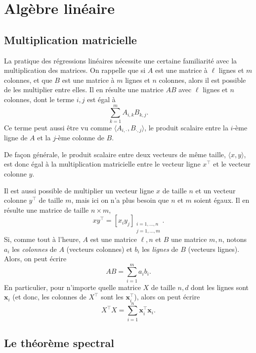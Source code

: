 \documentclass[
  10,
  letterpaper,
  DIV=11,
  numbers=noendperiod]{scrreport}
\newcommand{\bx}{\mathbf{x}}
\theoremstyle{plain}
\theoremstyle{definition}
\theoremstyle{plain}
\theoremstyle{definition}
\theoremstyle{definition}
\theoremstyle{plain}
\theoremstyle{remark}
\begin{document}

\hypertarget{app-al}{%
\chapter{Algèbre linéaire}\label{app-al}}

\hypertarget{multiplication-matricielle}{%
\section{Multiplication matricielle}\label{multiplication-matricielle}}

La pratique des régressions linéaires nécessite une certaine familiarité
avec la multiplication des matrices. On rappelle que si \(A\) est une
matrice à \(\ell\) lignes et \(m\) colonnes, et que \(B\) est une
matrice à \(m\) lignes et \(n\) colonnes, alors il est possible de les
multiplier entre elles. Il en résulte une matrice \(AB\) avec \(\ell\)
lignes et \(n\) colonnes, dont le terme \(i,j\) est égal à
\[\sum_{k=1}^m A_{i,k}B_{k,j}. \] Ce terme peut aussi être vu comme
\(\langle A_{i, \cdot}, B_{\cdot, j}\rangle\), le produit scalaire entre
la \(i\)-ème ligne de \(A\) et la \(j\)-ème colonne de \(B\).

De façon générale, le produit scalaire entre deux vecteurs de même
taille, \(\langle x, y\rangle\), est donc égal à la multiplication
matricielle entre le vecteur ligne \(x^\top\) et le vecteur colonne
\(y\).

Il est aussi possible de multiplier un vecteur ligne \(x\) de taille
\(n\) et un vecteur colonne \(y^\top\) de taille \(m\), mais ici on n'a
plus besoin que \(n\) et \(m\) soient égaux. Il en résulte une matrice
de taille \(n\times m\),
\[xy^\top = [x_i y_j]_{\substack{i=1, \dotsc, n\\ j=1,\dotsc, m}}.\] Si,
comme tout à l'heure, \(A\) est une matrice \(\ell,n\) et \(B\) une
matrice \(m,n\), notons \(a_i\) les \emph{colonnes} de \(A\) (vecteurs
colonnes) et \(b_i\) les \emph{lignes} de \(B\) (vecteurs lignes).
Alors, on peut écrire \[ AB = \sum_{i=1}^m a_i b_i. \] En particulier,
pour n'importe quelle matrice \(X\) de taille \(n,d\) dont les lignes
sont \(\bx_i\) (et donc, les colonnes de \(X^\top\) sont les
\(\bx_i^\top\)), alors on peut écrire
\[X^\top X = \sum_{i=1}^n \bx_i^\top \bx_i.\]

\hypertarget{le-thuxe9oruxe8me-spectral}{%
\section{Le théorème spectral}\label{le-thuxe9oruxe8me-spectral}}
\end{document}
